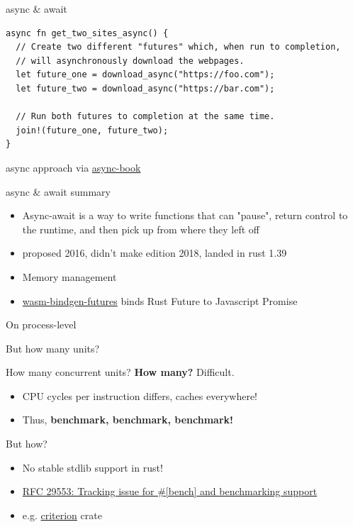 \documentclass{beamer}
\begin{document}
\begin{frame}[fragile]{async \& await}
  \begin{verbatim}
async fn get_two_sites_async() {
  // Create two different "futures" which, when run to completion,
  // will asynchronously download the webpages.
  let future_one = download_async("https://foo.com");
  let future_two = download_async("https://bar.com");

  // Run both futures to completion at the same time.
  join!(future_one, future_two);
}
  \end{verbatim}
  async approach via \href{https://rust-lang.github.io/async-book/01_getting_started/02_why_async.html}{async-book}
\end{frame}

\begin{frame}[fragile]{async \& await summary}
  \begin{itemize}
    \item Async-await is a way to write functions that can "pause", return control to the runtime, and then pick up from where they left off
    \item proposed 2016, didn't make edition 2018, landed in rust 1.39
    \item Memory management
    \item \href{https://docs.rs/crate/wasm-bindgen-futures/0.4.17}{wasm-bindgen-futures} binds Rust Future to Javascript Promise
  \end{itemize}
\end{frame}

\begin{frame}[standout]
  On process-level
\end{frame}


\begin{frame}[standout]
  But how many units?
\end{frame}

\begin{frame}[fragile]{How many concurrent units?}
  \textbf{How many?} Difficult.
  \begin{itemize}
    \item CPU cycles per instruction differs, caches everywhere!
    \item Thus, \textbf{benchmark, benchmark, benchmark!}
  \end{itemize}
  But how?
  \begin{itemize}
    \item No stable stdlib support in rust!
    \item \href{https://github.com/rust-lang/rust/issues/29553}{RFC 29553: Tracking issue for #[bench] and benchmarking support}
    \item e.g. \href{https://crates.io/crates/criterion}{criterion} crate
  \end{itemize}
\end{frame}
\end{document}
